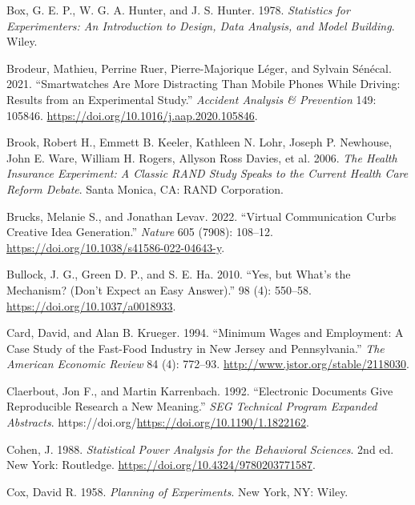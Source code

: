\documentclass[
  11pt,
  letterpaper,
]{scrbook}
\newlength{\cslhangindent}
\newlength{\cslentryspacingunit} %
\newenvironment{CSLReferences}[2] %
 {%
  \setlength{\parindent}{0pt}
  \ifodd #1
  \let\oldpar\par
  \def\par{\hangindent=\cslhangindent\oldpar}
  \fi
  \setlength{\parskip}{#2\cslentryspacingunit}
 }%
 {}
\theoremstyle{definition}
\theoremstyle{remark}
\begin{document}
\begin{CSLReferences}{1}{0}
\leavevmode{}%
Box, G. E. P., W. G. A. Hunter, and J. S. Hunter. 1978. \emph{Statistics
for Experimenters: An Introduction to Design, Data Analysis, and Model
Building}. Wiley.

\leavevmode{}%
Brodeur, Mathieu, Perrine Ruer, Pierre-Majorique Léger, and Sylvain
Sénécal. 2021. {``Smartwatches Are More Distracting Than Mobile Phones
While Driving: Results from an Experimental Study.''} \emph{Accident
Analysis \& Prevention} 149: 105846.
\url{https://doi.org/10.1016/j.aap.2020.105846}.

\leavevmode{}%
Brook, Robert H., Emmett B. Keeler, Kathleen N. Lohr, Joseph P.
Newhouse, John E. Ware, William H. Rogers, Allyson Ross Davies, et al.
2006. \emph{The {H}ealth {I}nsurance {E}xperiment: A Classic {RAND}
Study Speaks to the Current Health Care Reform Debate}. Santa Monica,
CA: RAND Corporation.

\leavevmode{}%
Brucks, Melanie S., and Jonathan Levav. 2022. {``Virtual Communication
Curbs Creative Idea Generation.''} \emph{Nature} 605 (7908): 108--12.
\url{https://doi.org/10.1038/s41586-022-04643-y}.

\leavevmode{}%
Bullock, J. G., Green D. P., and S. E. Ha. 2010. {``Yes, but What's the
Mechanism? (Don't Expect an Easy Answer).''} 98 (4): 550--58.
\url{https://doi.org/10.1037/a0018933}.

\leavevmode{}%
Card, David, and Alan B. Krueger. 1994. {``Minimum Wages and Employment:
A Case Study of the Fast-Food Industry in {N}ew {J}ersey and
{P}ennsylvania.''} \emph{The American Economic Review} 84 (4): 772--93.
\url{http://www.jstor.org/stable/2118030}.

\leavevmode{}%
Claerbout, Jon F., and Martin Karrenbach. 1992. {``Electronic Documents
Give Reproducible Research a New Meaning.''} \emph{SEG Technical Program
Expanded Abstracts}.
https://doi.org/\url{https://doi.org/10.1190/1.1822162}.

\leavevmode{}%
Cohen, J. 1988. \emph{Statistical Power Analysis for the Behavioral
Sciences}. 2nd ed. New York: Routledge.
\url{https://doi.org/10.4324/9780203771587}.

\leavevmode{}%
Cox, David R. 1958. \emph{Planning of Experiments}. New York, NY: Wiley.


\end{CSLReferences}
\end{document}
